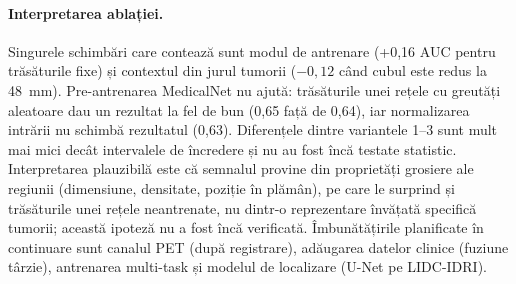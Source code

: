 \documentclass[11pt, a4paper]{article}
\begin{document}
\begin{table}[h]
\centering
\footnotesize
{}
\caption{Etapa de laborator 4: studiul de ablație pentru histologie (NSCLC-Radiogenomics, 141 de pacienți, 29 scuamoși, validare încrucișată în 5 fold-uri). Variantele 2--4 schimbă o singură componentă față de varianta 1. $^{*}$Prag de decizie greșit în rularea de referință (vezi îmbunătățirea 2).}
\label{tab:ablatie}
\end{table}

\paragraph{Interpretarea ablației.} Singurele schimbări care contează sunt modul de antrenare (+0,16 AUC pentru trăsăturile fixe) și contextul din jurul tumorii ($-0{,}12$ când cubul este redus la 48~mm). Pre-antrenarea MedicalNet nu ajută: trăsăturile unei rețele cu greutăți aleatoare dau un rezultat la fel de bun (0,65 față de 0,64), iar normalizarea intrării nu schimbă rezultatul (0,63). Diferențele dintre variantele 1--3 sunt mult mai mici decât intervalele de încredere și nu au fost încă testate statistic. Interpretarea plauzibilă este că semnalul provine din proprietăți grosiere ale regiunii (dimensiune, densitate, poziție în plămân), pe care le surprind și trăsăturile unei rețele neantrenate, nu dintr-o reprezentare învățată specifică tumorii; această ipoteză nu a fost încă verificată. Îmbunătățirile planificate în continuare sunt canalul PET (după registrare), adăugarea datelor clinice (fuziune târzie), antrenarea multi-task și modelul de localizare (U-Net pe LIDC-IDRI).
\end{document}
